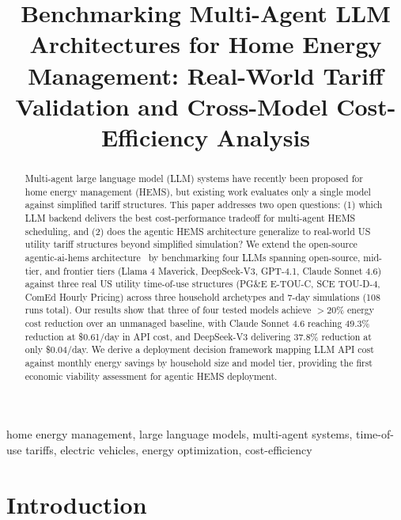 \documentclass[conference]{IEEEtran}
\begin{document}
\title{Benchmarking Multi-Agent LLM Architectures for Home Energy Management:
Real-World Tariff Validation and Cross-Model Cost-Efficiency Analysis}

\author{
}

\maketitle

\begin{abstract}
Multi-agent large language model (LLM) systems have recently been proposed
for home energy management (HEMS), but existing work evaluates only a single
model against simplified tariff structures.
This paper addresses two open questions:
(1) which LLM backend delivers the best cost-performance tradeoff for
multi-agent HEMS scheduling, and
(2) does the agentic HEMS architecture generalize to real-world US utility
tariff structures beyond simplified simulation?
We extend the open-source agentic-ai-hems architecture~\cite{makroum2025agentic}
by benchmarking four LLMs spanning open-source, mid-tier, and frontier tiers
(Llama 4 Maverick, DeepSeek-V3, GPT-4.1, Claude Sonnet 4.6) against three real US utility
time-of-use structures (PG\&E E-TOU-C, SCE TOU-D-4, ComEd Hourly Pricing)
across three household archetypes and 7-day simulations (108 runs total).
Our results show that three of four tested models achieve $>$20\% energy cost
reduction over an unmanaged baseline, with Claude Sonnet 4.6 reaching
49.3\% reduction at \$0.61/day in API cost, and DeepSeek-V3 delivering
37.8\% reduction at only \$0.04/day.
We derive a deployment decision framework mapping LLM API cost against
monthly energy savings by household size and model tier, providing the
first economic viability assessment for agentic HEMS deployment.
\end{abstract}

\begin{IEEEkeywords}
home energy management, large language models, multi-agent systems,
time-of-use tariffs, electric vehicles, energy optimization, cost-efficiency
\end{IEEEkeywords}

\section{Introduction}
\label{sec:intro}
\end{document}
